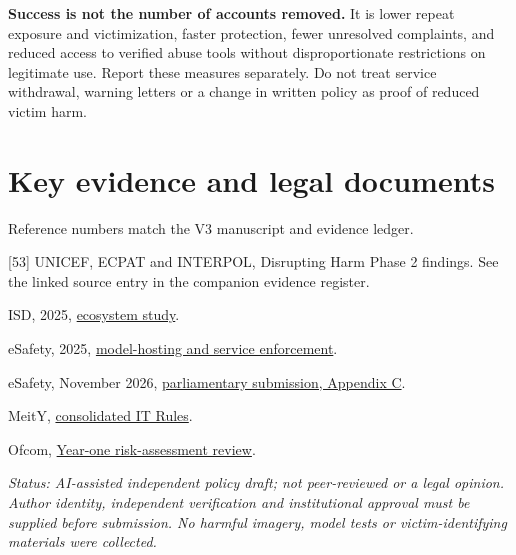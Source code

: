 \documentclass[11pt,a4paper]{article}
\begin{document}
\textbf{Success is not the number of accounts removed.} It is lower repeat exposure and victimization, faster protection, fewer unresolved complaints, and reduced access to verified abuse tools without disproportionate restrictions on legitimate use. Report these measures separately. Do not treat service withdrawal, warning letters or a change in written policy as proof of reduced victim harm.

\section*{Key evidence and legal documents}
Reference numbers match the V3 manuscript and evidence ledger.

[53] UNICEF, ECPAT and INTERPOL, Disrupting Harm Phase 2 findings. See the linked source entry in the companion evidence register.\par
[66] ISD, 2025, \href{https://www.isdglobal.org/digital-dispatch/the-ecosystem-of-nonconsensual-intimate-deepfake-tools-online/}{ecosystem study}.\par
[69] eSafety, 2025, \href{https://www.esafety.gov.au/newsroom/media-releases/esafety-action-prevents-services-nudifying-australian-school-children}{model-hosting and service enforcement}.\par
[70] eSafety, November 2026, \href{https://www.esafety.gov.au/sites/default/files/2026-11/eSafety_submission_Digital_Duty_of_Care_Bill_Senate_Committee_Inquiry.pdf}{parliamentary submission, Appendix C}.\par
[74] MeitY, \href{https://www.meity.gov.in/static/uploads/2026/03/0b576f2071694b52e4cd6bb1b6dfab1e.pdf}{consolidated IT Rules}.\par
[75] Ofcom, \href{https://www.ofcom.org.uk/siteassets/resources/documents/online-safety/research-statistics-and-data/os-standards/online-safety-risk-assessments-report-year-one.pdf?v=408834}{Year-one risk-assessment review}.

\textit{Status: AI-assisted independent policy draft; not peer-reviewed or a legal opinion. Author identity, independent verification and institutional approval must be supplied before submission. No harmful imagery, model tests or victim-identifying materials were collected.}
\end{document}
